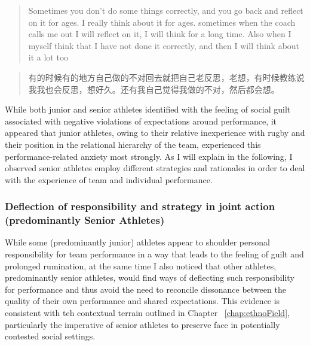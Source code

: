 \begin{CJK}{UTF8}{gbsn}
      \begin{quotation}
        Sometimes you don't do some things correctly, and you go back and reflect on it for ages. I really think about it for ages. sometimes when the coach calls me out I will reflect on it, I will think for a long time. Also when I myself think that I have not done it correctly, and then I will think about it a lot too
      \end{quotation}

      \begin{quotation}
        有的时候有的地方自己做的不对回去就把自己老反思，老想，有时候教练说我我也会反思，想好久。还有我自己觉得我做的不对，然后都会想。
      \end{quotation}


While both junior and senior athletes identified with the feeling of social guilt associated with negative violations of expectations around performance, it appeared that junior athletes, owing to their relative inexperience with rugby and their position in the relational hierarchy of the team, experienced this performance-related anxiety most strongly.  As I will explain in the following, I observed senior athletes employ different strategies and rationales in order to deal with the experience of team and individual performance.

\subsubsection{Deflection of responsibility and strategy in joint action (predominantly Senior Athletes)}

While some (predominantly junior) athletes appear to shoulder personal responsibility for team performance in a way that leads to the feeling of guilt and prolonged rumination, at the same time I also noticed that other athletes, predominantly senior athletes, would find ways of deflecting such responsibility for performance and thus avoid the need to reconcile dissonance between the quality of their own performance and shared expectations.  This evidence is consistent with teh contextual terrain outlined in Chapter ~\ref{chap:ethnoField}, particularly the imperative of senior athletes to preserve face in potentially contested social settings.


\end{CJK}
